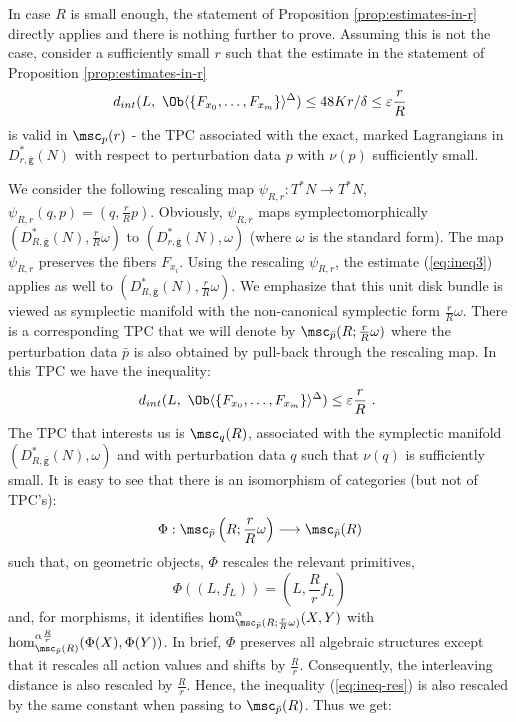 In case $R$ is small enough, the statement of Proposition  \ref{prop:estimates-in-r} directly applies and there is nothing further to prove. Assuming this is not the case, consider a sufficiently small $r$ such that the estimate in the statement of Proposition  \ref{prop:estimates-in-r}
\begin{equation}\label{eq:ineq3}d_{int}(L, \ \Ob \langle \{F_{x_{0}},\ldots, F_{x_{m}}\} \rangle^{\Delta} ) \leq 48 Kr/\delta 
\leq \varepsilon \frac{r}{R}\end{equation}
is valid in $\msc_{p} (r)$ - the TPC associated with the exact, marked Lagrangians in $D^{\ast}_{r, \bar{\mathtt{g}}}(N)$ with respect
to perturbation data $p$ with $\nu(p)$ sufficiently small.
 
We consider the following rescaling map $\psi_{R,r}: T^{\ast} N\to T^{\ast} N$, $\psi_{R,r}(q,p)=(q, \frac{r}{R}p)$.
 Obviously, $\psi_{R,r}$ maps symplectomorphically $(D^{\ast}_{R,\bar{\mathtt{g}}}(N), \frac{r}{R}\omega)$ to $(D^{\ast}_{r,\bar{\mathtt{g}}}(N), \omega)$ (where $\omega$ is the standard form).  The map $\psi_{R,r}$  preserves the fibers $F_{x_{i}}$.  Using the rescaling $\psi_{R,r}$, the estimate (\ref{eq:ineq3})  applies as well 
to $(D^{\ast}_{R,\bar{\mathtt{g}}}(N), \frac{r}{R}\omega)$.  We emphasize that  this unit disk bundle is viewed as symplectic manifold with the non-canonical symplectic form $\frac{r}{R}\omega$. There is a corresponding TPC that we will denote by $\msc_{\bar{p}} (R; \frac{r}{R}\omega)$ where the perturbation data $\bar{p}$ is also obtained by pull-back through the rescaling map. In this TPC we have the inequality: 
\begin{equation}\label{eq:ineq-res} d_{int}(L, \ \Ob \langle \{ F_{x_{0}},\ldots, F_{x_{m}}\}\rangle^{\Delta}  ) \leq  \varepsilon \frac{r}{R}~.~
\end{equation} 
The TPC that interests us is $\msc_{q}(R)$, associated with the symplectic manifold $(D^{\ast}_{R,\bar{\mathtt{g}}}(N),\omega)$ and with  perturbation data $q$ such that $\nu(q)$ is sufficiently small.
 It is easy to see that there is an isomorphism of categories (but not of TPC's):
 $$\Phi :   \msc_{\bar{p}} \left(R; \frac{r}{R}\omega\right) \longrightarrow \msc_{\bar{p}}(R)$$
 such that, on geometric objects, $\Phi $ rescales the relevant primitives,   $$\Phi ( (L, f_{L})) = \left(L, \frac{R}{r} f_{L}\right)$$ and, for morphisms, it identifies $\hom^{\alpha}_{\msc_{\bar{p}} (R; \frac{r}{R}\omega)}(X,Y)$ with 
 $\hom^{\alpha\frac{R}{r}}_{\msc_{\bar{p}}(R)}(\Phi (X),\Phi (Y))$.
 In brief, $\Phi$ preserves all algebraic structures except that it rescales all action values and shifts by $\frac{R}{r}$.  Consequently, the interleaving distance is also rescaled by $\frac{R}{r}$. Hence, the inequality (\ref{eq:ineq-res}) is also rescaled by  the same constant when passing to $\msc_{\bar{p}}(R)$. Thus we get:
